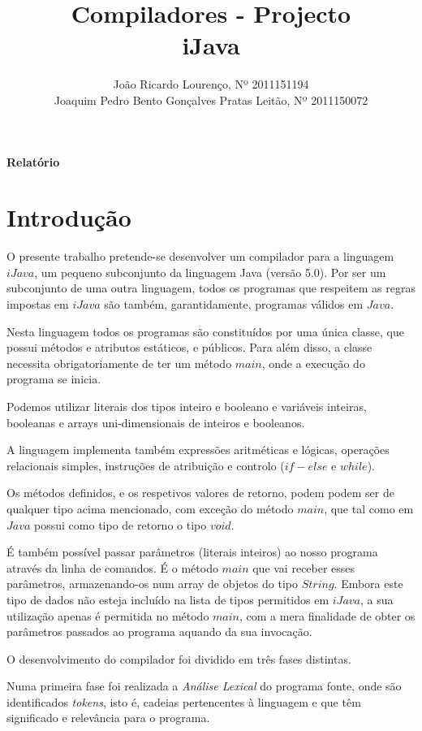 \documentclass[11pt,a4paper]{article}
\title{\bf{Compiladores - Projecto}\vspace{50mm}\\iJava\vspace{80mm}}
\author{
João Ricardo Lourenço, Nº 2011151194\\
Joaquim Pedro Bento Gonçalves Pratas Leitão, Nº 2011150072}
\begin{document}
\maketitle
\centerline{\textbf{Relatório}}
\pagebreak

\printindex

\renewcommand*\contentsname{Índice}
\tableofcontents

\pagebreak

\section{Introdução}

O presente trabalho pretende-se desenvolver um compilador para a linguagem $iJava$, um pequeno subconjunto da linguagem Java (versão 5.0). Por ser um subconjunto de uma outra linguagem, todos os programas que respeitem as regras impostas em $iJava$ são também, garantidamente, programas válidos em $Java$.

Nesta linguagem todos os programas são constituídos por uma única classe, que possui métodos e atributos estáticos, e públicos. Para além disso, a classe necessita obrigatoriamente de ter um método $main$, onde a execução do programa se inicia. 

Podemos utilizar literais dos tipos inteiro e booleano e variáveis inteiras, booleanas e arrays uni-dimensionais de inteiros e booleanos.

A linguagem implementa também expressões aritméticas e lógicas, operações relacionais simples, instruções de atribuição e controlo ($if-else$ e $while$).

Os métodos definidos, e os respetivos valores de retorno, podem podem ser de qualquer tipo acima mencionado, com exceção do método $main$, que tal como em $Java$ possui como tipo de retorno o tipo $void$.

É também possível passar parâmetros (literais inteiros) ao nosso programa através da linha de comandos. É o método $main$ que vai receber esses parâmetros, armazenando-os num array de objetos do tipo $String$. Embora este tipo de dados não esteja incluído na lista de tipos permitidos em $iJava$, a sua utilização apenas é permitida no método $main$, com a mera finalidade de obter os parâmetros passados ao programa aquando da sua invocação.

O desenvolvimento do compilador foi dividido em três fases distintas.

Numa primeira fase foi realizada a \emph{Análise Lexical} do programa fonte, onde são identificados \emph{tokens}, isto é, cadeias pertencentes à linguagem e que têm significado e relevância para o programa.
\end{document}
